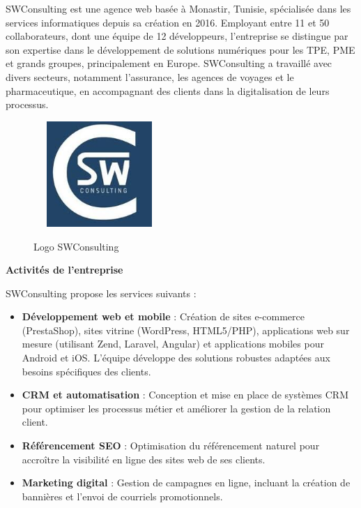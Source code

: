 \noindent SWConsulting est une agence web basée à Monastir, Tunisie, spécialisée dans les services informatiques depuis sa création en 2016. Employant entre 11 et 50 collaborateurs, dont une équipe de 12 développeurs, l'entreprise se distingue par son expertise dans le développement de solutions numériques pour les TPE, PME et grands groupes, principalement en Europe. SWConsulting a travaillé avec divers secteurs, notamment l'assurance, les agences de voyages et le pharmaceutique, en accompagnant des clients dans la digitalisation de leurs processus.

\begin{figure}[H]%
    \center%
{
    \includegraphics[width=5cm,height=4cm]{images/logoent.jpg}%
    }
    \caption{Logo SWConsulting}%
\end{figure}

\noindent\large\textbf{Activités de l'entreprise}\normalsize
\vspace{0.3em}

\noindent SWConsulting propose les services suivants :
\begin{itemize}
    \item \textbf{Développement web et mobile} : Création de sites e-commerce (PrestaShop), sites vitrine (WordPress, HTML5/PHP), applications web sur mesure (utilisant Zend, Laravel, Angular) et applications mobiles pour Android et iOS. L'équipe développe des solutions robustes adaptées aux besoins spécifiques des clients.

    \item \textbf{CRM et automatisation} : Conception et mise en place de systèmes CRM pour optimiser les processus métier et améliorer la gestion de la relation client.

    \item \textbf{Référencement SEO} : Optimisation du référencement naturel pour accroître la visibilité en ligne des sites web de ses clients.

    \item \textbf{Marketing digital} : Gestion de campagnes en ligne, incluant la création de bannières et l'envoi de courriels promotionnels.
\end{itemize}

